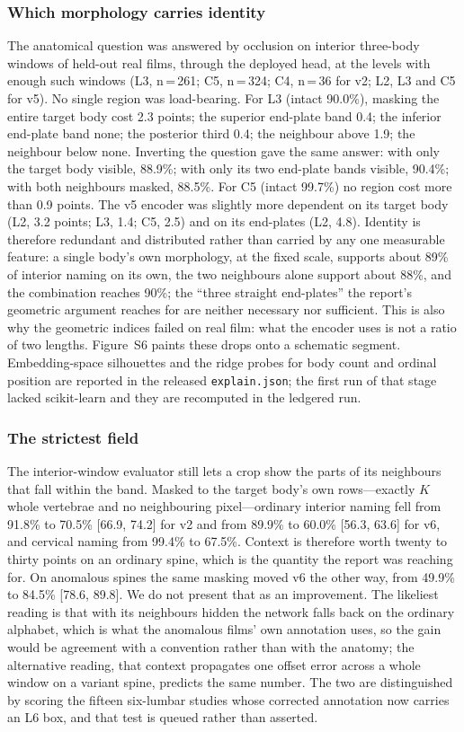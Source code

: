 \documentclass[11pt,letterpaper]{article}
\newcommand{\ci}[2]{[#1, #2]}
\begin{document}
\subsubsection*{Which morphology carries identity}
The anatomical question was answered by occlusion on interior three-body windows of held-out real films, through the deployed head, at the levels with enough such windows (L3, n\,=\,261; C5, n\,=\,324; C4, n\,=\,36 for v2; L2, L3 and C5 for v5). No single region was load-bearing. For L3 (intact 90.0\%), masking the entire target body cost 2.3 points; the superior end-plate band 0.4; the inferior end-plate band none; the posterior third 0.4; the neighbour above 1.9; the neighbour below none. Inverting the question gave the same answer: with only the target body visible, 88.9\%; with only its two end-plate bands visible, 90.4\%; with both neighbours masked, 88.5\%. For C5 (intact 99.7\%) no region cost more than 0.9 points. The v5 encoder was slightly more dependent on its target body (L2, 3.2 points; L3, 1.4; C5, 2.5) and on its end-plates (L2, 4.8). Identity is therefore redundant and distributed rather than carried by any one measurable feature: a single body's own morphology, at the fixed scale, supports about 89\% of interior naming on its own, the two neighbours alone support about 88\%, and the combination reaches 90\%; the ``three straight end-plates'' the report's geometric argument reaches for are neither necessary nor sufficient. This is also why the geometric indices failed on real film: what the encoder uses is not a ratio of two lengths. Figure~S6 paints these drops onto a schematic segment. Embedding-space silhouettes and the ridge probes for body count and ordinal position are reported in the released \texttt{explain.json}; the first run of that stage lacked scikit-learn and they are recomputed in the ledgered run.


\subsubsection*{The strictest field}
The interior-window evaluator still lets a crop show the parts of its neighbours that fall within the band. Masked to the target body's own rows---exactly $K$ whole vertebrae and no neighbouring pixel---ordinary interior naming fell from 91.8\% to 70.5\% \ci{66.9}{74.2} for v2 and from 89.9\% to 60.0\% \ci{56.3}{63.6} for v6, and cervical naming from 99.4\% to 67.5\%. Context is therefore worth twenty to thirty points on an ordinary spine, which is the quantity the report was reaching for. On anomalous spines the same masking moved v6 the other way, from 49.9\% to 84.5\% \ci{78.6}{89.8}. We do not present that as an improvement. The likeliest reading is that with its neighbours hidden the network falls back on the ordinary alphabet, which is what the anomalous films' own annotation uses, so the gain would be agreement with a convention rather than with the anatomy; the alternative reading, that context propagates one offset error across a whole window on a variant spine, predicts the same number. The two are distinguished by scoring the fifteen six-lumbar studies whose corrected annotation now carries an L6 box, and that test is queued rather than asserted.
\end{document}
